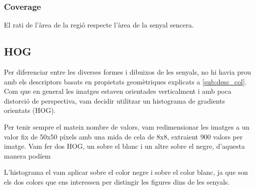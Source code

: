 \subsubsection{Coverage}

El rati de l'àrea de la regió respecte l'àrea de la senyal sencera.

\subsection{HOG}%
\label{sub:HOG}

Per diferenciar entre les diverses formes i dibuixos de les senyals, no hi havia prou amb els descriptors basats en
propietats geomètriques explicats a \cref{sub:desc_col}. Com que en general les imatges estaven orientades verticalment
i amb poca distorci\'o de perspectiva, vam decidir utilitzar un histograma de gradients orientats (HOG).


Per tenir sempre el mateix nombre de valors, vam redimensionar les imatges a un valor fix de 50x50 píxels amb
una mida de cela de 8x8, extraient  900 valors per imatge. Vam fer dos HOG, un sobre el blanc i un altre sobre el negre,
d'aquesta manera podíem 


L'histograma el vam aplicar sobre el color negre i sobre el color
blanc, ja que son els dos colors que ens interessen per distingir les figures dins de les senyals.


